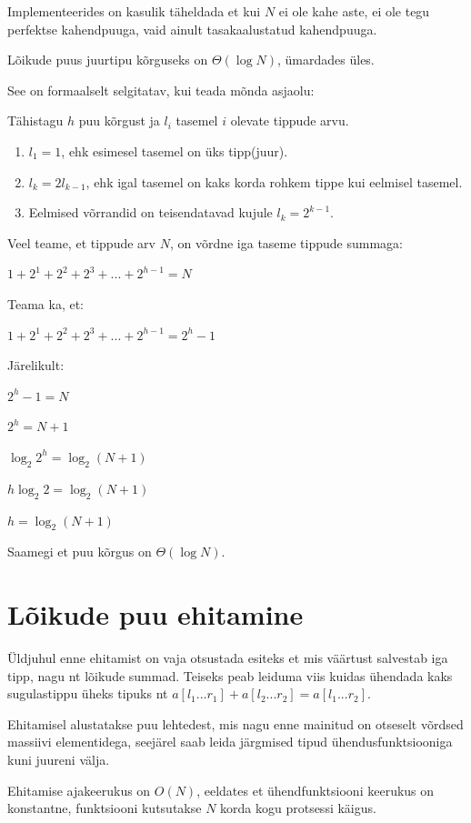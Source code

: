 \documentclass{trkut}
\begin{document}
Implementeerides on kasulik täheldada et kui $N$ ei ole kahe aste, ei ole tegu perfektse kahendpuuga, vaid ainult tasakaalustatud kahendpuuga. 

Lõikude puus juurtipu kõrguseks on $\Theta(\log N)$, ümardades üles. \parencite{EMaxx}

See on formaalselt selgitatav, kui teada mõnda asjaolu:

Tähistagu $h$ puu kõrgust ja $l_i$ tasemel $i$ olevate tippude arvu.
\begin{enumerate}
    \item $l_1 = 1$, ehk esimesel tasemel on üks tipp(juur).
    \item $l_k = 2l_{k−1}$, ehk igal tasemel on kaks korda rohkem tippe kui eelmisel tasemel.
    \item Eelmised võrrandid on teisendatavad kujule $l_k = 2^{k−1}$.
\end{enumerate}

Veel teame, et tippude arv $N$, on võrdne iga taseme tippude summaga:

$1 + 2^1 + 2^2 + 2^3 + ... + 2^{h−1} = N$

Teama ka, et:

$1 + 2^1 + 2^2 + 2^3 + ... + 2^{h−1} = 2^h − 1$

Järelikult:
    
$2^h − 1 = N$

$2^h = N + 1$
 
$\log_2 2^h = \log_2 (N + 1)$

$h \log_2 2 = \log_2 (N + 1)$

$h = \log_2(N + 1)$

Saamegi et puu kõrgus on $\Theta(\log N)$. \parencite{height}

\section{Lõikude puu ehitamine}
Üldjuhul enne ehitamist on vaja otsustada esiteks et mis väärtust salvestab iga tipp, nagu nt lõikude summad. Teiseks peab leiduma viis kuidas ühendada kaks sugulastippu üheks tipuks nt $a[l_1...r_1]+a[l_2...r_2]=a[l_1...r_2]$. \parencite{EMaxx}

Ehitamisel alustatakse puu lehtedest, mis nagu enne mainitud on otseselt võrdsed massiivi elementidega, seejärel saab leida järgmised tipud ühendusfunktsiooniga kuni juureni välja. \parencite{EMaxx}

Ehitamise ajakeerukus on $O(N)$, eeldates et ühendfunktsiooni keerukus on konstantne, funktsiooni kutsutakse $N$ korda kogu protsessi käigus. \parencite{EMaxx}
\end{document}
